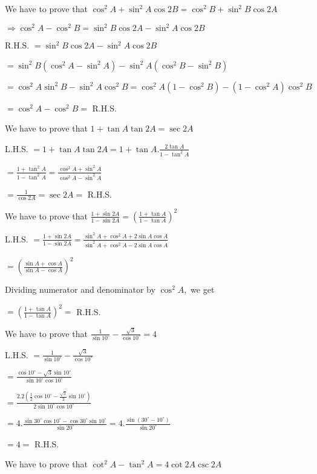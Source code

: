 \item We have to prove that $\cos^2A + \sin^2A\cos 2B = \cos^2B + \sin^2B\cos 2A$

  $\Rightarrow \cos^2A - \cos^2B = \sin^2B\cos2A - \sin^2A\cos2B$

  R.H.S. $= \sin^2B\cos2A - \sin^2A\cos2B$

  $= \sin^2B(\cos^2A - \sin^2A) - \sin^2A(\cos^2B - \sin^2B)$

  $= \cos^2A\sin^2B - \sin^2A\cos^2B = \cos^2A(1 - \cos^2B) - (1 - \cos^2A)\cos^2B$

  $= \cos^2A - \cos^2B =$ R.H.S.

\item We have to prove that $1 + \tan A\tan 2A = \sec 2A$

  L.H.S. $= 1 + \tan A\tan 2A = 1 + \tan A.\frac{2\tan A}{1 - \tan^2A}$

  $= \frac{1 + \tan^2A}{1 - \tan^2A} = \frac{\cos^2A + \sin^2A}{\cos^2A - \sin^2A}$

  $= \frac{1}{\cos 2A} = \sec 2A =$ R.H.S.

\item We have to prove that $\frac{1 + \sin 2A}{1 - \sin 2A} = \left(\frac{1 + \tan A}{1 - \tan A}\right)^2$

  L.H.S. $= \frac{1 + \sin 2A}{1 - \sin 2A} = \frac{\sin^2A + \cos^2A + 2\sin A\cos A}{\sin^2A + \cos^2A - 2\sin A\cos A}$

  $= \left(\frac{\sin A + \cos A}{\sin A - \cos A}\right)^2$

  Dividing numerator and denominator by $\cos^2A,$ we get

  $= \left(\frac{1 + \tan A}{1 - \tan A}\right)^2 =$ R.H.S.

\item We have to prove that $\frac{1}{\sin 10^\circ} - \frac{\sqrt{3}}{\cos 10^\circ} = 4$

  L.H.S. $= \frac{1}{\sin 10^\circ} - \frac{\sqrt{3}}{\cos 10^\circ}$

  $= \frac{\cos10^\circ - \sqrt{3}\sin10^\circ}{\sin10^\circ\cos10^\circ}$

  $= \frac{2.2\left(\frac{1}{2}\cos10^\circ - \frac{\sqrt{3}}{2}\sin10^\circ\right)}{2\sin10^\circ\cos10^\circ}$

  $= 4.\frac{\sin30^\circ\cos10^\circ - \cos30^\circ\sin10^\circ}{\sin20^\circ} = 4.\frac{\sin(30^\circ -
    10^\circ)}{\sin20^\circ}$

  $= 4 =$ R.H.S.

\item We have to prove that $\cot^2A - \tan^2A = 4\cot2A\csc 2A$

